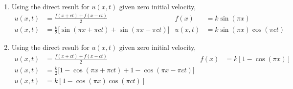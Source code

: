 \begin{enumerate}
    \item Using the direct result for $ u(x, t) $ given zero initial velocity,
          \begin{align}
              u(x, t)        & = \frac{f(x + ct) + f(x - ct)}{2}                    &
              f(x)           & = k \sin(\pi x)                                        \\
              u(x, t)        & = \frac{k}{2} \Big[\sin(\pi x + \pi ct) + \sin(\pi x
              - \pi ct)\Big] &
              u(x, t)        & = k \sin(\pi x) \cos(\pi ct)
          \end{align}

          \begin{figure}[H]
              \centering
          \end{figure}

    \item Using the direct result for $ u(x, t) $ given zero initial velocity,
          \begin{align}
              u(x, t) & = \frac{f(x + ct) + f(x - ct)}{2}            &
              f(x)    & = k [1 - \cos(\pi x)]                          \\
              u(x, t) & = \frac{k}{2} \Big[ 1 - \cos(\pi x + \pi ct)
              + 1 - \cos(\pi x - \pi ct) \Big]                         \\
              u(x, t) & = k [1 - \cos(\pi x) \cos(\pi ct)]
          \end{align}


\end{enumerate}
